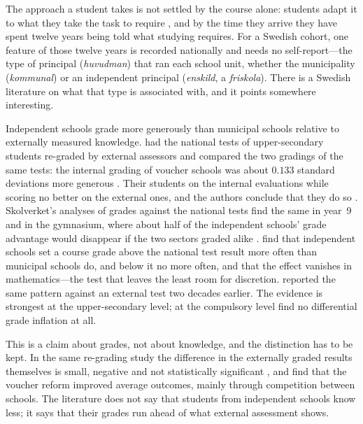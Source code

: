 The approach a student takes is not settled by the course alone: students
adapt it to what they take the task to require
\autocite{MartonSaljo1976II}, and by the time they arrive they have spent
twelve years being told what studying requires.
For a Swedish cohort, one feature of those twelve years is recorded
nationally and needs no self-report---the type of principal
(\emph{huvudman}) that ran each school unit, whether the municipality
(\emph{kommunal}) or an independent principal (\emph{enskild}, a
\emph{friskola}).
There is a Swedish literature on what that type is associated with, and it
points somewhere interesting.

Independent schools grade more generously than municipal schools relative
to externally measured knowledge.
\Textcite{HinnerichVlachos2017} had the national tests of upper-secondary
students re-graded by external assessors and compared the two gradings of
the same tests: the internal grading of voucher schools was about
\(0.133\) standard deviations more generous
\autocite[Table~2]{HinnerichVlachos2017}.
Their students  on the internal evaluations while scoring
no better on the external ones, and the authors conclude that they do so
.
Skolverket's analyses of grades against the national tests find the same
in year~9 \autocite[p.~37]{Skolverket2019Betyg} and in the gymnasium,
where about half of the independent schools' grade advantage would
disappear if the two sectors graded alike
\autocite[p.~42]{Skolverket2020Betyg}.
\Textcite{EdmarkPersson2021} find that independent schools set a course
grade above the national test result more often than municipal schools do,
and below it no more often, and that the effect vanishes in
mathematics---the test that leaves the least room for discretion.
\Textcite{WikstromWikstrom2005} reported the same pattern against an
external test two decades earlier.
The evidence is strongest at the upper-secondary level; at the compulsory
level \textcite{BohlmarkLindahl2015} find no differential grade inflation
at all.

This is a claim about grades, not about knowledge, and the distinction has
to be kept.
In the same re-grading study the difference in the externally graded
results themselves is small, negative and not statistically significant
\autocite[Table~2]{HinnerichVlachos2017}, and
\textcite{BohlmarkLindahl2015} find that the voucher reform improved
average outcomes, mainly through competition between schools.
The literature does not say that students from independent schools know
less; it says that their grades run ahead of what external assessment
shows.


